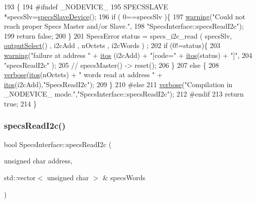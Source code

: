 \begin{DoxyCode}
193                                               \{
194 \textcolor{preprocessor}{#ifndef \_NODEVICE\_
}
195   SPECSSLAVE *specsSlv=\hyperlink{classSpecsInterface_ac8d4711197f484f055533ec1e5ae01a1}{specsSlaveDevice}();
196   \textcolor{keywordflow}{if} ( 0==specsSlv )\{
197     \hyperlink{classObject_a65cd4fda577711660821fd2cd5a3b4c9}{warning}(\textcolor{stringliteral}{"Could not reach proper Specs Master and/or Slave."},
198             \textcolor{stringliteral}{"SpecsInterface::specsReadI2c"});
199     \textcolor{keywordflow}{return} \textcolor{keyword}{false};
200   \}
201   SpecsError status = specs\_i2c\_read ( specsSlv, \hyperlink{classSpecsInterface_ab291ed03f4c2f0143e14c26ad5f648dd}{outputSelect}() , i2cAdd , nOctets , i2cWords )
      ;
202   \textcolor{keywordflow}{if} (0!=status)\{
203     \hyperlink{classObject_a65cd4fda577711660821fd2cd5a3b4c9}{warning}(\textcolor{stringliteral}{"failure at address "} + \hyperlink{Tools_8h_af330027dbdafb9a30768b3613c553e60}{itos} (i2cAdd) + \textcolor{stringliteral}{"[code="} + \hyperlink{Tools_8h_af330027dbdafb9a30768b3613c553e60}{itos}(status) + \textcolor{stringliteral}{"]"},
204             \textcolor{stringliteral}{"specsReadI2c"} );
205     \textcolor{comment}{//    specsMaster() -> reset();}
206   \}
207   \textcolor{keywordflow}{else} \{
208     \hyperlink{classObject_a83d2db2df682907ea1115ad721c1c4a1}{verbose}(\hyperlink{Tools_8h_af330027dbdafb9a30768b3613c553e60}{itos}(nOctets) + \textcolor{stringliteral}{" words read at address "} + \hyperlink{Tools_8h_af330027dbdafb9a30768b3613c553e60}{itos}(i2cAdd),\textcolor{stringliteral}{"SpecsReadI2c"});
209   \}
210 \textcolor{preprocessor}{#else
}
211   \hyperlink{classObject_a83d2db2df682907ea1115ad721c1c4a1}{verbose}(\textcolor{stringliteral}{"Compilation in \_NODEVICE\_ mode."},\textcolor{stringliteral}{"SpecsInterface::specsReadI2c"});
212 \textcolor{preprocessor}{#endif
}
213   \textcolor{keywordflow}{return} \textcolor{keyword}{true};
214 \}
\end{DoxyCode}
\mbox{\label{classSpecsInterface_ab61d866ec9b8a48e84a867004c1ed662}} 
\subsubsection{\texorpdfstring{specs\+Read\+I2c()}{specsReadI2c()}\hspace{0.1cm}{\footnotesize\ttfamily [2/4]}}
{\footnotesize\ttfamily bool Specs\+Interface\+::specs\+Read\+I2c (\begin{DoxyParamCaption}\item[{unsigned char}]{address,  }\item[{std\+::vector$<$ unsigned char $>$ \&}]{specs\+Words }\end{DoxyParamCaption})}


